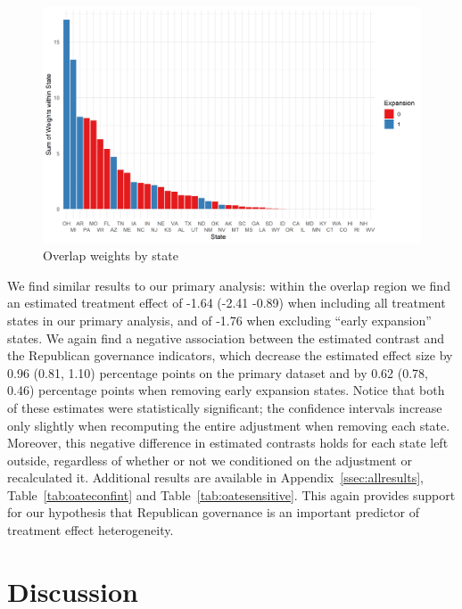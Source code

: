 \documentclass[12pt]{article}
\begin{document}
\begin{figure}[]
\begin{center}
    \includegraphics[scale=0.6]{01_Plots/oate-region-c1-a.png}
    \caption{Overlap weights by state}
    \label{oatearea}
\end{center}
\end{figure}

We find similar results to our primary analysis: within the overlap region we find an estimated treatment effect of -1.64 (-2.41 -0.89) when including all treatment states in our primary analysis, and of -1.76 when excluding ``early expansion'' states. We again find a negative association between the estimated contrast and the Republican governance indicators, which decrease the estimated effect size by 0.96 (0.81, 1.10) percentage points on the primary dataset and by 0.62 (0.78, 0.46) percentage points when removing early expansion states. Notice that both of these estimates were statistically significant; the confidence intervals increase only slightly when recomputing the entire adjustment when removing each state. Moreover, this negative difference in estimated contrasts holds for each state left outside, regardless of whether or not we conditioned on the adjustment or recalculated it. Additional results are available in Appendix~\ref{ssec:allresults}, Table~\ref{tab:oateconfint} and Table~\ref{tab:oatesensitive}. This again provides support for our hypothesis that Republican governance is an important predictor of treatment effect heterogeneity.

\section{Discussion}
\end{document}
